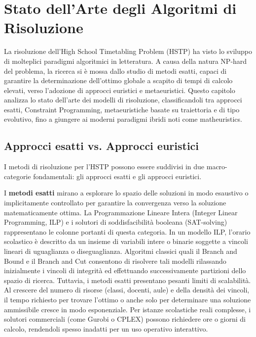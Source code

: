 \chapter{Stato dell'Arte degli Algoritmi di Risoluzione}
\label{chap:capitolo2}

La risoluzione dell'High School Timetabling Problem (HSTP) ha visto lo sviluppo di molteplici paradigmi algoritmici in letteratura. A causa della natura NP-hard del problema, la ricerca si è mossa dallo studio di metodi esatti, capaci di garantire la determinazione dell'ottimo globale a scapito di tempi di calcolo elevati, verso l'adozione di approcci euristici e metaeuristici. Questo capitolo analizza lo stato dell'arte dei modelli di risoluzione, classificandoli tra approcci esatti, Constraint Programming, metaeuristiche basate su traiettoria e di tipo evolutivo, fino a giungere ai moderni paradigmi ibridi noti come matheuristics.

\section{Approcci esatti vs. Approcci euristici}
\label{sec:approcci-esatti-euristici}

I metodi di risoluzione per l'HSTP possono essere suddivisi in due macro-categorie fondamentali: gli approcci esatti e gli approcci euristici.

I \textbf{metodi esatti} mirano a esplorare lo spazio delle soluzioni in modo esaustivo o implicitamente controllato per garantire la convergenza verso la soluzione matematicamente ottima. La Programmazione Lineare Intera (Integer Linear Programming, ILP) e i solutori di soddisfacibilità booleana (SAT-solving) rappresentano le colonne portanti di questa categoria. In un modello ILP, l'orario scolastico è descritto da un insieme di variabili intere o binarie soggette a vincoli lineari di uguaglianza o diseguaglianza. Algoritmi classici quali il Branch and Bound e il Branch and Cut consentono di risolvere tali modelli rilassando inizialmente i vincoli di integrità ed effettuando successivamente partizioni dello spazio di ricerca.
Tuttavia, i metodi esatti presentano pesanti limiti di scalabilità. Al crescere del numero di risorse (classi, docenti, aule) e della densità dei vincoli, il tempo richiesto per trovare l'ottimo o anche solo per determinare una soluzione ammissibile cresce in modo esponenziale. Per istanze scolastiche reali complesse, i solutori commerciali (come Gurobi o CPLEX) possono richiedere ore o giorni di calcolo, rendendoli spesso inadatti per un uso operativo interattivo.

